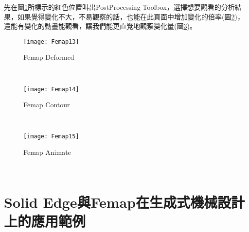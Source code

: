 \begin{itemize}
\qquad 先在圖\ref{3.13}所標示的紅色位置叫出PostProcessing Toolbox，選擇想要觀看的分析結果，如果覺得變化不大，不易觀察的話，也能在此頁面中增加變化的倍率(圖\ref{3.14})，還能有變化的動畫能觀看，讓我們能更直覺地觀察變化量(圖\ref{3.15})。\\
\begin{figure}[hbt!]
\begin{center}
\texttt{[image: Femap13]}
\caption{\Large Femap Deformed}\label{3.13}
\end{center}
\end{figure}
\\
\begin{figure}[hbt!]
\begin{center}
\texttt{[image: Femap14]}
\caption{\Large Femap Contour}\label{3.14}
\end{center}
\end{figure}
\\
\begin{figure}[hbt!]
\begin{center}
\texttt{[image: Femap15]}
\caption{\Large Femap Animate}\label{3.15}
\end{center}
\end{figure}
\\
\end{itemize}

\section{Solid Edge與Femap在生成式機械設計上的應用範例}
\newpage